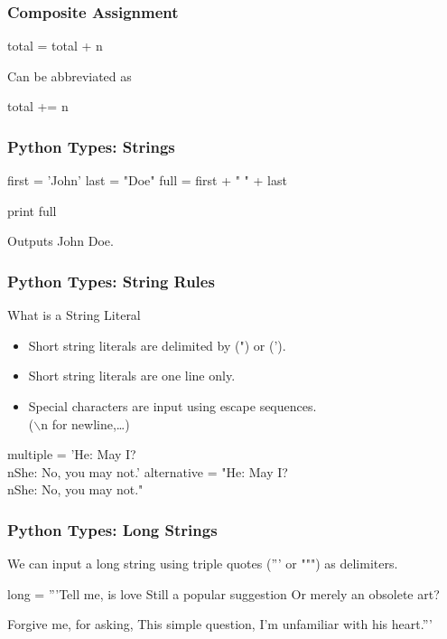 \begin{frame}[fragile]
\frametitle{Composite Assignment}

\begin{python}
total = total + n
\end{python}

Can be abbreviated as

\begin{python}
total += n
\end{python}

\end{frame}

\begin{frame}[fragile]
\frametitle{Python Types: Strings}

\begin{python}
first = 'John'
last = "Doe"
full = first + " " + last

print full
\end{python}

\pause
Outputs \alert{John Doe}.
\end{frame}

\begin{frame}[fragile]
\frametitle{Python Types: String Rules}

\begin{block}{What is a String Literal}
\begin{itemize}
\item Short string literals are delimited by (") or (').
\item Short string literals are one line only.
\item Special characters are input using escape sequences.\\
        ($\backslash$n for newline,\ldots)
\end{itemize}
\end{block}

\begin{python}
multiple = 'He: May I?\\nShe: No, you may not.'
alternative = "He: May I?\\nShe: No, you may not."
\end{python}
\end{frame}

\begin{frame}[fragile]
\frametitle{Python Types: Long Strings}

We can input a long string using triple quotes (''' or """) as delimiters.

\begin{python}
long = '''Tell me, is love
Still a popular suggestion
Or merely an obsolete art?

Forgive me, for asking,
This simple question,
I'm unfamiliar with his heart.'''
\end{python}
\end{frame}

